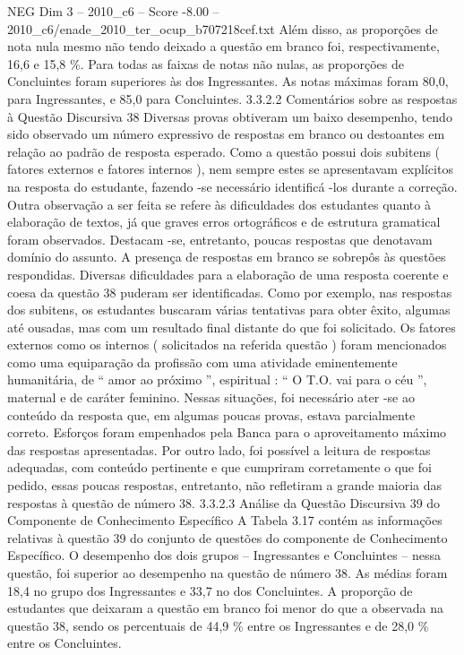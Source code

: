 \begin{textsample}{NEG Dim 3 – 2010\_c6 – Score -8.00 – 2010\_c6/enade\_2010\_ter\_ocup\_b707218cef.txt}
Além disso, as proporções de nota nula mesmo não tendo deixado a questão em branco foi, respectivamente, 16,6 e 15,8 \%.
Para todas as faixas de notas não nulas, as proporções de Concluintes foram superiores às dos Ingressantes.
As notas máximas foram 80,0, para Ingressantes, e 85,0 para Concluintes. 3.3.2.2 Comentários sobre as respostas à Questão Discursiva 38 Diversas provas obtiveram um baixo desempenho, tendo sido observado um número expressivo de respostas em branco ou destoantes em relação ao padrão de resposta esperado.
Como a questão possui dois subitens ( fatores externos e fatores internos ), nem sempre estes se apresentavam explícitos na resposta do estudante, fazendo -se necessário identificá -los durante a correção.
Outra observação a ser feita se refere às dificuldades dos estudantes quanto à elaboração de textos, já que graves erros ortográficos e de estrutura gramatical foram observados.
Destacam -se, entretanto, poucas respostas que denotavam domínio do assunto.
A presença de respostas em branco se sobrepôs às questões respondidas.
Diversas dificuldades para a elaboração de uma resposta coerente e coesa da questão 38 puderam ser identificadas.
Como por exemplo, nas respostas dos subitens, os estudantes buscaram várias tentativas para obter êxito, algumas até ousadas, mas com um resultado final distante do que foi solicitado.
Os fatores externos como os internos ( solicitados na referida questão ) foram mencionados como uma equiparação da profissão com uma atividade eminentemente humanitária, de “ amor ao próximo ”, espiritual : “ O T.O. vai para o céu ”, maternal e de caráter feminino.
Nessas situações, foi necessário ater -se ao conteúdo da resposta que, em algumas poucas provas, estava parcialmente correto.
Esforços foram empenhados pela Banca para o aproveitamento máximo das respostas apresentadas.
Por outro lado, foi possível a leitura de respostas adequadas, com conteúdo pertinente e que cumpriram corretamente o que foi pedido, essas poucas respostas, entretanto, não refletiram a grande maioria das respostas à questão de número 38. 3.3.2.3 Análise da Questão Discursiva 39 do Componente de Conhecimento Específico A Tabela 3.17 contém as informações relativas à questão 39 do conjunto de questões do componente de Conhecimento Específico.
O desempenho dos dois grupos – Ingressantes e Concluintes – nessa questão, foi superior ao desempenho na questão de número 38.
As médias foram 18,4 no grupo dos Ingressantes e 33,7 no dos Concluintes.
A proporção de estudantes que deixaram a questão em branco foi menor do que a observada na questão 38, sendo os percentuais de 44,9 \% entre os Ingressantes e de 28,0 \% entre os Concluintes.

\end{textsample}
